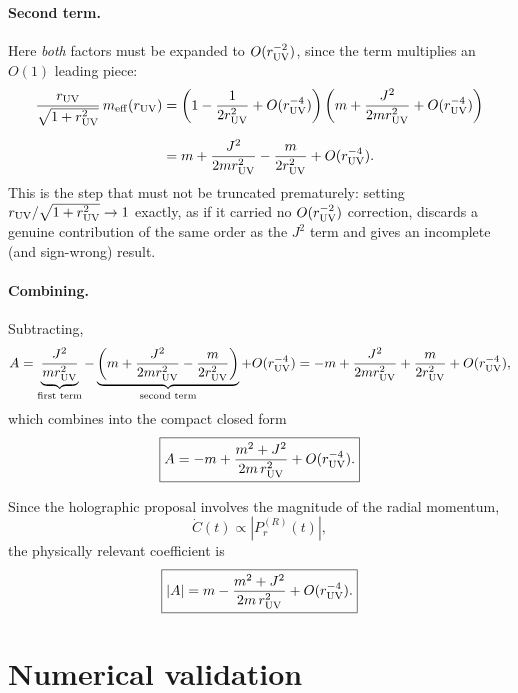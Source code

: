\documentclass[11pt]{article}
\begin{document}
\paragraph{Second term.} Here \emph{both} factors must be expanded to $O(r_{\rm UV}^{-2})$, since the term multiplies an $O(1)$ leading piece:
\begin{align}
\frac{r_{\rm UV}}{\sqrt{1+r_{\rm UV}^2}}\,m_{\rm eff}(r_{\rm UV})
&=
\left(1-\frac{1}{2r_{\rm UV}^2}+O(r_{\rm UV}^{-4})\right)
\left(m+\frac{J^2}{2mr_{\rm UV}^2}+O(r_{\rm UV}^{-4})\right)
\notag\\[2mm]
&=
m
+
\frac{J^2}{2mr_{\rm UV}^2}
-
\frac{m}{2r_{\rm UV}^2}
+
O(r_{\rm UV}^{-4}).
\end{align}
This is the step that must not be truncated prematurely: setting $r_{\rm UV}/\sqrt{1+r_{\rm UV}^2}\to1$ exactly, as if it carried no $O(r_{\rm UV}^{-2})$ correction, discards a genuine contribution of the same order as the $J^2$ term and gives an incomplete (and sign-wrong) result.

\paragraph{Combining.} Subtracting,
\begin{equation}
A
=
\underbrace{\frac{J^2}{mr_{\rm UV}^2}}_{\text{first term}}
-
\underbrace{\left(m+\frac{J^2}{2mr_{\rm UV}^2}-\frac{m}{2r_{\rm UV}^2}\right)}_{\text{second term}}
+
O(r_{\rm UV}^{-4})
=
-m
+
\frac{J^2}{2mr_{\rm UV}^2}
+
\frac{m}{2r_{\rm UV}^2}
+
O(r_{\rm UV}^{-4}),
\end{equation}
which combines into the compact closed form
\begin{equation}
\boxed{
A
=
-m
+
\frac{m^2+J^2}{2m\,r_{\rm UV}^2}
+
O(r_{\rm UV}^{-4}).
}
\label{eq:A-expansion-final}
\end{equation}

Since the holographic proposal involves the magnitude of the radial momentum,
\begin{equation}
\dot C(t)\propto |P_r^{(R)}(t)|,
\end{equation}
the physically relevant coefficient is
\begin{equation}
\boxed{
|A|
=
m
-
\frac{m^2+J^2}{2m\,r_{\rm UV}^2}
+
O(r_{\rm UV}^{-4}).
}
\label{eq:A-abs-final}
\end{equation}

\section{Numerical validation}
\label{subsec:numerics}
\end{document}
